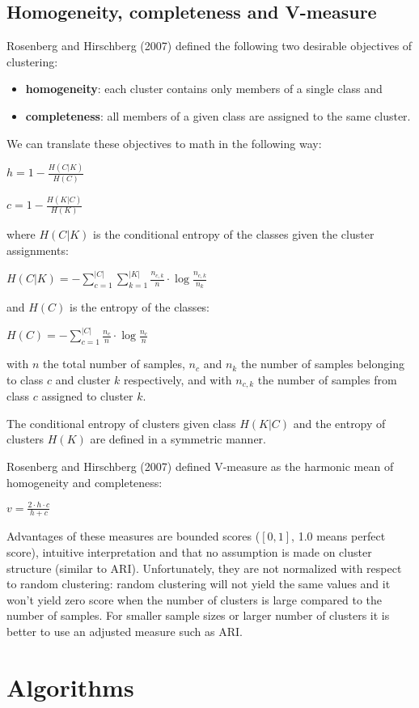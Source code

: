 \documentclass[conference]{IEEEtran}
\begin{document}
\subsection{Homogeneity, completeness and V-measure}
Rosenberg and Hirschberg (2007) defined the following two desirable objectives of clustering:
\begin{itemize}
    \item \textbf{homogeneity}: each cluster contains only members of a single class and
    \item \textbf{completeness}: all members of a given class are assigned to the same cluster.
\end{itemize}
We can translate these objectives to math in the following way:

$h = 1 - \frac{H(C|K)}{H(C)}$

$c = 1 - \frac{H(K|C)}{H(K)}$

where $H(C|K)$ is the conditional entropy of the classes given the cluster assignments:

$H(C|K) = - \sum\limits_{c=1}^{|C|}\sum\limits_{k=1}^{|K|}\frac{n_{c,k}}{n}\cdot \log{\frac{n_{c,k}}{n_k}}$

and $H(C)$ is the entropy of the classes:

$H(C) = - \sum\limits_{c=1}^{|C|}\frac{n_c}{n} \cdot \log{\frac{n_c}{n}}$

with $n$ the total number of samples, $n_c$ and $n_k$ the number of samples belonging to class
$c$ and cluster $k$ respectively, and with $n_{c,k}$ the number of samples from class $c$ assigned
to cluster $k$.

The conditional entropy of clusters given class $H(K|C)$ and the entropy of clusters $H(K)$ are
defined in a symmetric manner.

Rosenberg and Hirschberg (2007) defined V-measure as the harmonic mean of homogeneity and completeness:

$v = \frac{2 \cdot h \cdot c}{h+c}$

Advantages of these measures are bounded scores ($[0, 1]$, 1.0 means perfect score), intuitive interpretation and that
no assumption is made on cluster structure (similar to ARI). Unfortunately, they are not normalized
with respect to random clustering: random clustering will not yield the same values and it won't
yield zero score when the number of clusters is large compared to the number of samples. For smaller
sample sizes or larger number of clusters it is better to use an adjusted measure such as ARI.

\section{Algorithms}
\end{document}
